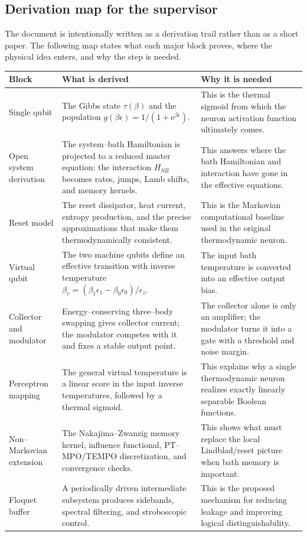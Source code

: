 \documentclass[11pt,a4paper]{article}
\theoremstyle{plain}
\theoremstyle{definition}
\theoremstyle{remark}
\newcommand{\ee}{\mathrm{e}}
\begin{document}
\subsection*{Derivation map for the supervisor}
The document is intentionally written as a derivation trail rather than
as a short paper.  The following map states what each major block proves,
where the physical idea enters, and why the step is needed.
\begin{center}
\small
\begin{tabularx}{\textwidth}{@{}l X X@{}}
\toprule
Block & What is derived & Why it is needed \\
\midrule
Single qubit &
The Gibbs state $\tau(\beta)$ and the population
$g(\beta\epsilon)=1/(1+\ee^{\beta\epsilon})$. &
This is the thermal sigmoid from which the neuron activation function
ultimately comes. \\
Open system derivation &
The system--bath Hamiltonian is projected to a reduced master equation;
the interaction $H_{SB}$ becomes rates, jumps, Lamb shifts, and memory
kernels. &
This answers where the bath Hamiltonian and interaction have gone in the
effective equations. \\
Reset model &
The reset dissipator, heat current, entropy production, and the precise
approximations that make them thermodynamically consistent. &
This is the Markovian computational baseline used in the original
thermodynamic neuron. \\
Virtual qubit &
The two machine qubits define an effective transition with inverse
temperature $\beta_v=(\beta_1\epsilon_1-\beta_0\epsilon_0)/\epsilon_z$. &
The input bath temperature is converted into an effective output bias. \\
Collector and modulator &
Energy--conserving three--body swapping gives collector current; the
modulator competes with it and fixes a stable output point. &
The collector alone is only an amplifier; the modulator turns it into a
gate with a threshold and noise margin. \\
Perceptron mapping &
The general virtual temperature is a linear score in the input inverse
temperatures, followed by a thermal sigmoid. &
This explains why a single thermodynamic neuron realizes exactly
linearly separable Boolean functions. \\
Non--Markovian extension &
The Nakajima--Zwanzig memory kernel, influence functional, PT--MPO/TEMPO
discretization, and convergence checks. &
This shows what must replace the local Lindblad/reset picture when bath
memory is important. \\
Floquet buffer &
A periodically driven intermediate subsystem produces sidebands,
spectral filtering, and stroboscopic control. &
This is the proposed mechanism for reducing leakage and improving
logical distinguishability. \\
\bottomrule
\end{tabularx}
\end{center}
\end{document}
